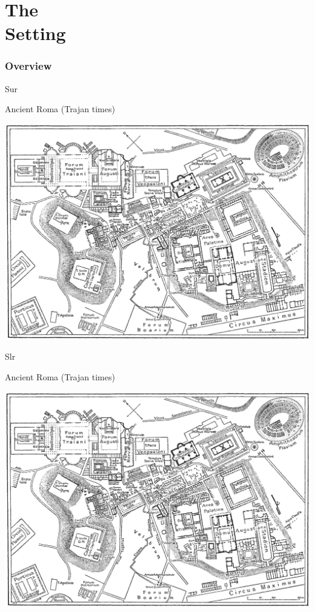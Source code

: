 \documentclass[print,Draft]{faosyb}
\begin{document}
\addtocounter{page}{1}  %

\mainmatter
{}
\part[The Setting]{The\\ Setting}
\lipsum
\EndPartIntro

\section{Overview}
\label{sec:first}

\begin{map}{S}{ur}
\caption{Ancient Roma \newline (Trajan times)}
\label{map:roma}
\includegraphics[width=\chartwidth,height=\chartheight]{Rome}
\end{map}

\begin{map}{S}{lr}
\caption{Ancient Roma \newline (Trajan times)}
\label{map:roma}
\includegraphics[width=\chartwidth,height=\chartheight]{Rome}
\end{map}
\end{document}
